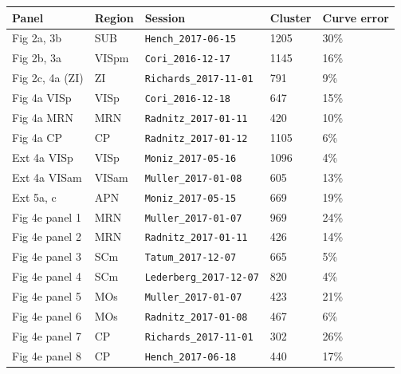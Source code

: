 \begin{longtable}{@{}p{3.6cm}p{1.5cm}p{5.4cm}p{1.4cm}p{2cm}@{}}
\toprule
Panel & Region & Session & Cluster & Curve error \\
\midrule
\endhead
Fig 2a, 3b & SUB & \texttt{Hench\_2017-06-15} & 1205 & 30\% \\
Fig 2b, 3a & VISpm & \texttt{Cori\_2016-12-17} & 1145 & 16\% \\
Fig 2c, 4a (ZI) & ZI & \texttt{Richards\_2017-11-01} & 791 & 9\% \\
Fig 4a VISp & VISp & \texttt{Cori\_2016-12-18} & 647 & 15\% \\
Fig 4a MRN & MRN & \texttt{Radnitz\_2017-01-11} & 420 & 10\% \\
Fig 4a CP & CP & \texttt{Radnitz\_2017-01-12} & 1105 & 6\% \\
Ext 4a VISp & VISp & \texttt{Moniz\_2017-05-16} & 1096 & 4\% \\
Ext 4a VISam & VISam & \texttt{Muller\_2017-01-08} & 605 & 13\% \\
Ext 5a, c & APN & \texttt{Moniz\_2017-05-15} & 669 & 19\% \\
Fig 4e panel 1 & MRN & \texttt{Muller\_2017-01-07} & 969 & 24\% \\
Fig 4e panel 2 & MRN & \texttt{Radnitz\_2017-01-11} & 426 & 14\% \\
Fig 4e panel 3 & SCm & \texttt{Tatum\_2017-12-07} & 665 & 5\% \\
Fig 4e panel 4 & SCm & \texttt{Lederberg\_2017-12-07} & 820 & 4\% \\
Fig 4e panel 5 & MOs & \texttt{Muller\_2017-01-07} & 423 & 21\% \\
Fig 4e panel 6 & MOs & \texttt{Radnitz\_2017-01-08} & 467 & 6\% \\
Fig 4e panel 7 & CP & \texttt{Richards\_2017-11-01} & 302 & 26\% \\
Fig 4e panel 8 & CP & \texttt{Hench\_2017-06-18} & 440 & 17\% \\
\bottomrule
\end{longtable}
